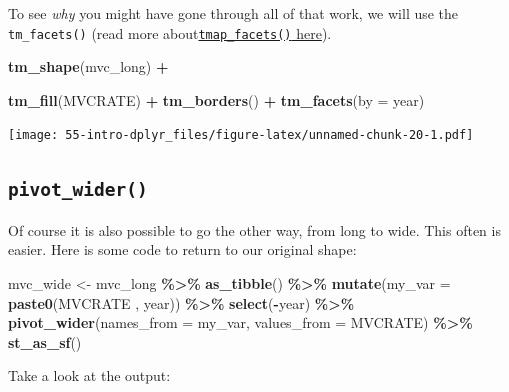 \documentclass[
]{book}
\newenvironment{Shaded}{\begin{snugshade}}{\end{snugshade}}
\newcommand{\AttributeTok}[1]{\textcolor[rgb]{0.13,0.29,0.53}{#1}}
\newcommand{\FunctionTok}[1]{\textcolor[rgb]{0.13,0.29,0.53}{\textbf{#1}}}
\newcommand{\NormalTok}[1]{#1}
\newcommand{\OtherTok}[1]{\textcolor[rgb]{0.56,0.35,0.01}{#1}}
\newcommand{\SpecialCharTok}[1]{\textcolor[rgb]{0.81,0.36,0.00}{\textbf{#1}}}
\newcommand{\StringTok}[1]{\textcolor[rgb]{0.31,0.60,0.02}{#1}}
\begin{document}
To see \emph{why} you might have gone through all of that work, we will use the \texttt{tm\_facets()} (read more about\protect\hyperlink{tmap-facet}{\texttt{tmap\_facets()} here}).

\begin{Shaded}
\begin{Highlighting}[]
\FunctionTok{tm\_shape}\NormalTok{(mvc\_long) }\SpecialCharTok{+}
  
  \FunctionTok{tm\_fill}\NormalTok{(}\StringTok{\textquotesingle{}MVCRATE\textquotesingle{}}\NormalTok{) }\SpecialCharTok{+} 
  \FunctionTok{tm\_borders}\NormalTok{() }\SpecialCharTok{+}
\FunctionTok{tm\_facets}\NormalTok{(}\AttributeTok{by =} \StringTok{\textquotesingle{}year\textquotesingle{}}\NormalTok{)}
\end{Highlighting}
\end{Shaded}

\texttt{[image: 55-intro-dplyr\_files/figure-latex/unnamed-chunk-20-1.pdf]}

\hypertarget{pivot_wider}{%
\subsection{\texorpdfstring{\texttt{pivot\_wider()}}{pivot\_wider()}}\label{pivot_wider}}

Of course it is also possible to go the other way, from long to wide. This often is easier. Here is some code to return to our original shape:

\begin{Shaded}
\begin{Highlighting}[]
\NormalTok{mvc\_wide }\OtherTok{\textless{}{-}}\NormalTok{ mvc\_long }\SpecialCharTok{\%\textgreater{}\%}
  \FunctionTok{as\_tibble}\NormalTok{() }\SpecialCharTok{\%\textgreater{}\%}
  \FunctionTok{mutate}\NormalTok{(}\AttributeTok{my\_var =} \FunctionTok{paste0}\NormalTok{(}\StringTok{\textquotesingle{}MVCRATE \textquotesingle{}}\NormalTok{, year)) }\SpecialCharTok{\%\textgreater{}\%}
  \FunctionTok{select}\NormalTok{(}\SpecialCharTok{{-}}\NormalTok{year) }\SpecialCharTok{\%\textgreater{}\%}
  \FunctionTok{pivot\_wider}\NormalTok{(}\AttributeTok{names\_from =}\NormalTok{ my\_var,}
              \AttributeTok{values\_from =}\NormalTok{ MVCRATE) }\SpecialCharTok{\%\textgreater{}\%}
  \FunctionTok{st\_as\_sf}\NormalTok{()}
\end{Highlighting}
\end{Shaded}

Take a look at the output:
\end{document}

